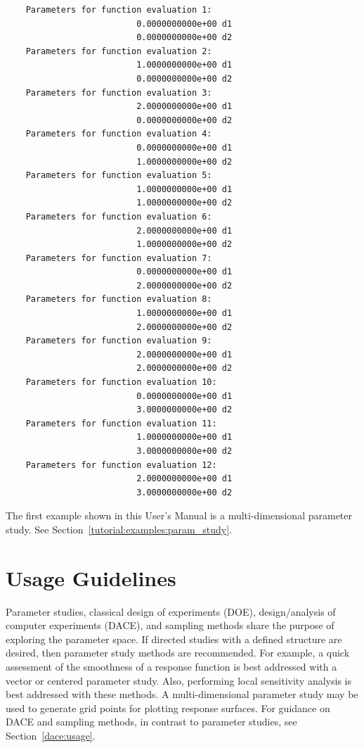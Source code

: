 \begin{small}
\begin{verbatim}
    Parameters for function evaluation 1:
                          0.0000000000e+00 d1   
                          0.0000000000e+00 d2   
    Parameters for function evaluation 2:
                          1.0000000000e+00 d1   
                          0.0000000000e+00 d2   
    Parameters for function evaluation 3:
                          2.0000000000e+00 d1   
                          0.0000000000e+00 d2   
    Parameters for function evaluation 4:
                          0.0000000000e+00 d1   
                          1.0000000000e+00 d2   
    Parameters for function evaluation 5:
                          1.0000000000e+00 d1   
                          1.0000000000e+00 d2   
    Parameters for function evaluation 6:
                          2.0000000000e+00 d1   
                          1.0000000000e+00 d2   
    Parameters for function evaluation 7:
                          0.0000000000e+00 d1   
                          2.0000000000e+00 d2   
    Parameters for function evaluation 8:
                          1.0000000000e+00 d1   
                          2.0000000000e+00 d2   
    Parameters for function evaluation 9:
                          2.0000000000e+00 d1   
                          2.0000000000e+00 d2   
    Parameters for function evaluation 10:
                          0.0000000000e+00 d1   
                          3.0000000000e+00 d2   
    Parameters for function evaluation 11:
                          1.0000000000e+00 d1   
                          3.0000000000e+00 d2   
    Parameters for function evaluation 12:
                          2.0000000000e+00 d1   
                          3.0000000000e+00 d2
\end{verbatim}
\end{small}

The first example shown in this User's Manual is a multi-dimensional
parameter study. See Section~\ref{tutorial:examples:param_study}.

\section{Usage Guidelines}\label{ps:usage}

Parameter studies, classical design of experiments (DOE),
design/analysis of computer experiments (DACE), and sampling methods
share the purpose of exploring the parameter space.  If directed
studies with a defined structure are desired, then parameter study
methods are recommended. For example, a quick assessment of the
smoothness of a response function is best addressed with a vector or
centered parameter study. Also, performing local sensitivity analysis
is best addressed with these methods. A multi-dimensional parameter 
study may be used to generate grid points for plotting response surfaces.
For guidance on DACE and sampling methods, in contrast to parameter 
studies, see Section~\ref{dace:usage}.
